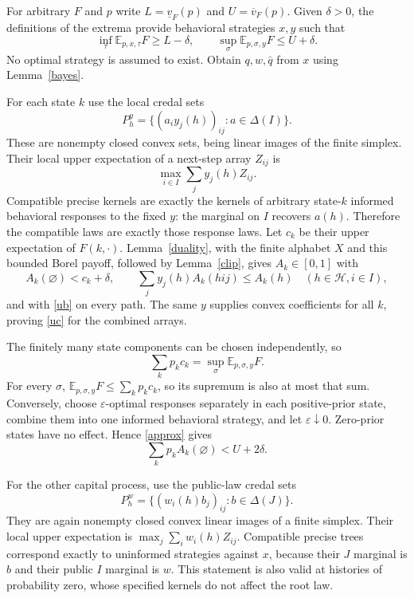 \documentclass[11pt,a4paper]{article}
\theoremstyle{definition}
\theoremstyle{remark}
\newcommand{\E}{\mathbb E}
\newcommand{\HH}{\mathcal H}
\newcommand{\lv}{\underline v}
\newcommand{\uv}{\overline v}
\begin{document}
For arbitrary $F$ and $p$ write $L=\lv_F(p)$ and $U=\uv_F(p)$. Given
$\delta>0$, the definitions of the extrema provide behavioral strategies
$x,y$ such that
\begin{equation}
 \inf_\tau\E_{p,x,\tau}F\geq L-\delta,
 \qquad \sup_\sigma\E_{p,\sigma,y}F\leq U+\delta.
 \label{approx}
\end{equation}
No optimal strategy is assumed to exist. Obtain $q,w,\bar q$ from $x$
using Lemma~\ref{bayes}.

For each state $k$ use the local credal sets
\[
 P_h^y=\{(a_i y_j(h))_{ij}:a\in\Delta(I)\}.
\]
These are nonempty closed convex sets, being linear images of the
finite simplex. Their local upper expectation of a next-step array
$Z_{ij}$ is
\[
 \max_{i\in I}\sum_j y_j(h)Z_{ij}.
\]
Compatible precise kernels are exactly the kernels of arbitrary
state-$k$ informed behavioral responses to the fixed $y$: the marginal
on $I$ recovers $a(h)$. Therefore the compatible laws are exactly those
response laws. Let $c_k$ be their upper expectation of $F(k,\cdot)$.
Lemma~\ref{duality}, with the finite alphabet $X$ and this bounded Borel
payoff, followed by Lemma~\ref{clip}, gives $A_k\in[0,1]$ with
\[
 A_k(\varnothing)<c_k+\delta,\qquad
 \sum_j y_j(h)A_k(hij)\leq A_k(h)\quad(h\in\HH,i\in I),
\]
and with \eqref{ub} on every path. The same $y$ supplies convex
coefficients for all $k$, proving \eqref{uc} for the combined arrays.

The finitely many state components can be chosen independently, so
\begin{equation}
 \sum_k p_k c_k=\sup_\sigma\E_{p,\sigma,y}F.
 \label{statewise}
\end{equation}
For every $\sigma$, $\E_{p,\sigma,y}F\leq\sum_k p_k c_k$, so its
supremum is also at most that sum. Conversely, choose
$\varepsilon$-optimal responses separately in each positive-prior state,
combine them into one informed behavioral strategy, and let
$\varepsilon\downarrow0$. Zero-prior states have no effect. Hence
\eqref{approx} gives
\begin{equation}
 \sum_k p_k A_k(\varnothing)<U+2\delta.
 \label{acost}
\end{equation}

For the other capital process, use the public-law credal sets
\[
 P_h^w=\{(w_i(h)b_j)_{ij}:b\in\Delta(J)\}.
\]
They are again nonempty closed convex linear images of a finite
simplex. Their local upper expectation is
$\max_j\sum_i w_i(h)Z_{ij}$. Compatible precise trees correspond exactly
to uninformed strategies against $x$, because their $J$ marginal is
$b$ and their public $I$ marginal is $w$. This statement is also valid
at histories of probability zero, whose specified kernels do not
affect the root law.
\end{document}
